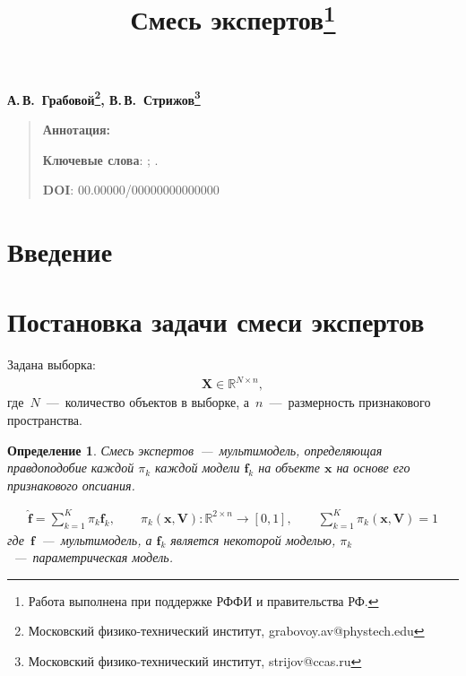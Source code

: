 \documentclass[12pt, twoside]{article}
\newtheorem{definition}{Определение}[section]
\numberwithin{equation}{section}
\begin{document}
\title{\bf Смесь экспертов\thanks{Работа выполнена при поддержке РФФИ и правительства РФ.}}
\date{}
\author{}
\maketitle

\begin{center}
\bf
А.\,В.~Грабовой\footnote{Московский физико-технический институт, grabovoy.av@phystech.edu}, В.\,В.~Стрижов\footnote{Московский физико-технический институт, strijov@ccas.ru}

\end{center}

{\centering\begin{quote}
\textbf{Аннотация:} 


\smallskip
\textbf{Ключевые слова}: ; .

\smallskip
\textbf{DOI}: 00.00000/00000000000000
\end{quote}
}

\section{Введение}

\section{Постановка задачи смеси экспертов}

Задана выборка:
\begin{equation}
\label{eq:st:1}
\begin{aligned}
\textbf{X} \in \mathbb{R}^{N \times n},
\end{aligned}
\end{equation}
где~$N$~---~количество объектов в выборке, а~$n$~---~размерность признакового пространства.

\begin{definition}
Смесь экспертов~---~мультимодель, определяющая правдоподобие каждой $\pi_k$ каждой модели $\textbf{f}_k$ на объекте $\textbf{x}$ на основе его признакового опсиания.

\begin{equation}
\label{eq:st:2}
\begin{aligned}
\hat{\textbf{f}} = \sum_{k=1}^{K}\pi_{k}\textbf{f}_k, \qquad \pi_{k}\left(\textbf{x}, \textbf{V}\right):\mathbb{R}^{2\times n} \to [0, 1], \qquad \sum_{k=1}^{K}\pi_{k}\left(\textbf{x}, \textbf{V}\right) = 1
\end{aligned}
\end{equation}
где~$\textbf{f}$~---~мультимодель, а $\textbf{f}_k$ является некоторой моделью, $\pi_k$~---~параметрическая модель.
\end{definition}
\end{document}
